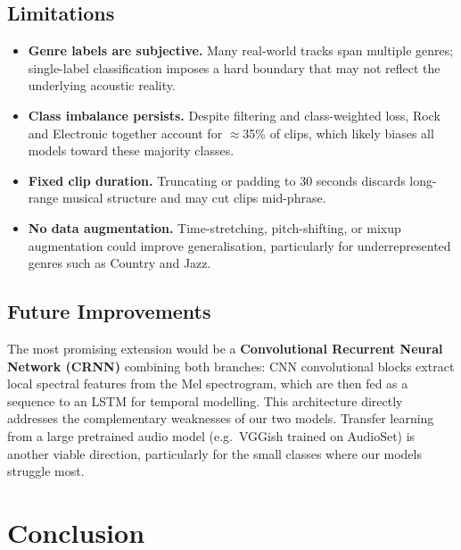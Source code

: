 \documentclass[12pt, a4paper]{article}
\begin{document}
\subsection{Limitations}

\begin{itemize}[noitemsep, topsep=4pt]
    \item \textbf{Genre labels are subjective.} Many real-world tracks span multiple
          genres; single-label classification imposes a hard boundary that may not
          reflect the underlying acoustic reality.
    \item \textbf{Class imbalance persists.} Despite filtering and class-weighted loss,
          Rock and Electronic together account for $\approx$35\% of clips, which likely
          biases all models toward these majority classes.
    \item \textbf{Fixed clip duration.} Truncating or padding to 30 seconds discards
          long-range musical structure and may cut clips mid-phrase.
    \item \textbf{No data augmentation.} Time-stretching, pitch-shifting, or mixup
          augmentation could improve generalisation, particularly for underrepresented
          genres such as Country and Jazz.
\end{itemize}

\subsection{Future Improvements}

The most promising extension would be a \textbf{Convolutional Recurrent Neural Network
(CRNN)} \citep{choi2017crnn} combining both branches: CNN convolutional blocks extract
local spectral features from the Mel spectrogram, which are then fed as a sequence to an
LSTM for temporal modelling. This architecture directly addresses the complementary
weaknesses of our two models. Transfer learning from a large pretrained audio model
(e.g.\ VGGish trained on AudioSet) is another viable direction, particularly for the
small classes where our models struggle most.

\section{Conclusion}
\label{sec:conclusion}
\end{document}
